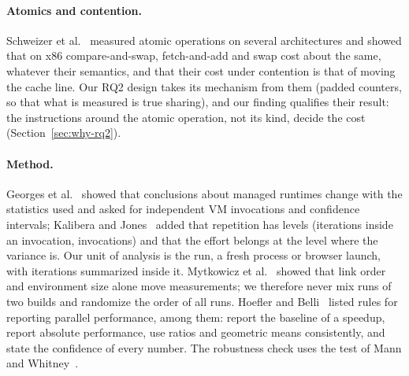 \paragraph{Atomics and contention.} Schweizer et al.~\cite{schweizer2015}
measured atomic operations on several architectures and showed that on x86
compare-and-swap, fetch-and-add and swap cost about the same, whatever their
semantics, and that their cost under contention is that of moving the cache
line. Our RQ2 design takes its mechanism from them (padded counters, so that
what is measured is true sharing), and our finding qualifies their result:
the instructions around the atomic operation, not its kind, decide the cost
(Section~\ref{sec:why-rq2}).

\paragraph{Method.} Georges et al.~\cite{georges2007} showed that
conclusions about managed runtimes change with the statistics used and
asked for independent VM invocations and confidence intervals; Kalibera and
Jones~\cite{kalibera2013} added that repetition has levels (iterations
inside an invocation, invocations) and that the effort belongs at the level
where the variance is. Our unit of analysis is the run, a fresh process or
browser launch, with iterations summarized inside it. Mytkowicz et
al.~\cite{mytkowicz2009} showed that link order and environment size alone
move measurements; we therefore never mix runs of two builds and randomize
the order of all runs. Hoefler and Belli~\cite{hoefler2015} listed rules for
reporting parallel performance, among them: report the baseline of a
speedup, report absolute performance, use ratios and geometric means
consistently, and state the confidence of every number. The robustness check
uses the test of Mann and Whitney~\cite{mann1947}.

